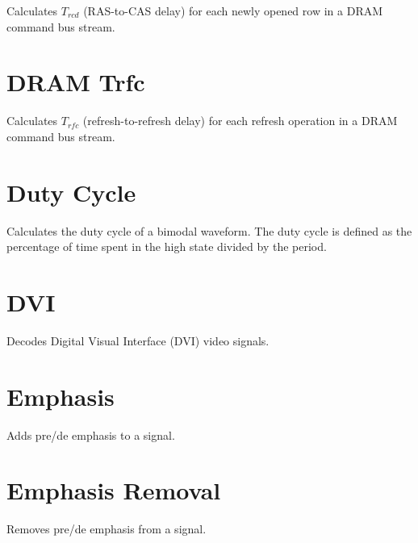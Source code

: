 Calculates $T_{rcd}$ (RAS-to-CAS delay) for each newly opened row in a DRAM command bus stream.

\pagebreak
\section{DRAM Trfc}

Calculates $T_{rfc}$ (refresh-to-refresh delay) for each refresh operation in a DRAM command bus stream.

\pagebreak
\section{Duty Cycle}

Calculates the duty cycle of a bimodal waveform. The duty cycle is defined as the percentage of time spent in the high
state divided by the period.

\pagebreak
\section{DVI}
\label{filter:dvi}

Decodes Digital Visual Interface (DVI) video signals.

\pagebreak
\section{Emphasis}

Adds pre/de emphasis to a signal.

\pagebreak
\section{Emphasis Removal}

Removes pre/de emphasis from a signal.

\pagebreak
